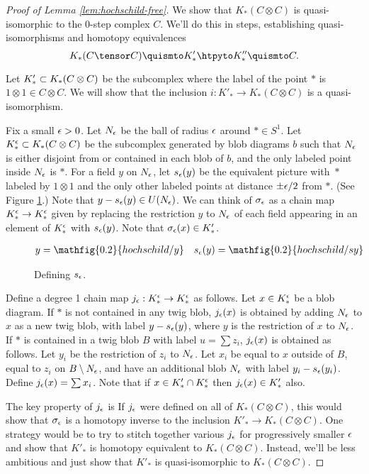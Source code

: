 \begin{proof}[Proof of Lemma \ref{lem:hochschild-free}]
We show that $K_*(C\otimes C)$ is
quasi-isomorphic to the 0-step complex $C$. We'll do this in steps, establishing quasi-isomorphisms and homotopy equivalences
$$K_*(C \tensor C) \quismto K'_* \htpyto K''_* \quismto C.$$

Let $K'_* \subset K_*(C\otimes C)$ be the subcomplex where the label of
the point $*$ is $1 \otimes 1 \in C\otimes C$.
We will show that the inclusion $i: K'_* \to K_*(C\otimes C)$ is a quasi-isomorphism.

Fix a small $\epsilon > 0$.
Let $N_\epsilon$ be the ball of radius $\epsilon$ around $* \in S^1$.
Let $K_*^\epsilon \subset K_*(C\otimes C)$ be the subcomplex
generated by blob diagrams $b$ such that $N_\epsilon$ is either disjoint from
or contained in each blob of $b$, and the only labeled point inside $N_\epsilon$ is $*$.
For a field $y$ on $N_\epsilon$, let $s_\epsilon(y)$ be the equivalent picture with~$*$
labeled by $1\otimes 1$ and the only other labeled points at distance $\pm\epsilon/2$ from $*$.
(See Figure \ref{fig:sy}.) Note that $y - s_\epsilon(y) \in U(N_\epsilon)$. We can think of
$\sigma_\epsilon$ as a chain map $K_*^\epsilon \to K_*^\epsilon$ given by replacing the restriction $y$ to $N_\epsilon$ of each field
appearing in an element of  $K_*^\epsilon$ with $s_\epsilon(y)$.
Note that $\sigma_\epsilon(x) \in K'_*$.
\begin{figure}[!ht]
\begin{align*}
y & = \mathfig{0.2}{hochschild/y} &
s_\ep(y) & = \mathfig{0.2}{hochschild/sy}
\end{align*}
\caption{Defining $s_\epsilon$.}
\label{fig:sy}
\end{figure}

Define a degree 1 chain map $j_\epsilon : K_*^\epsilon \to K_*^\epsilon$ as follows.
Let $x \in K_*^\epsilon$ be a blob diagram.
If $*$ is not contained in any twig blob, $j_\epsilon(x)$ is obtained by adding $N_\epsilon$ to
$x$ as a new twig blob, with label $y - s_\epsilon(y)$, where $y$ is the restriction of $x$ to $N_\epsilon$.
If $*$ is contained in a twig blob $B$ with label $u = \sum z_i$, $j_\epsilon(x)$ is obtained as follows.
Let $y_i$ be the restriction of $z_i$ to $N_\epsilon$.
Let $x_i$ be equal to $x$ outside of $B$, equal to $z_i$ on $B \setminus N_\epsilon$,
and have an additional blob $N_\epsilon$ with label $y_i - s_\epsilon(y_i)$.
Define $j_\epsilon(x) = \sum x_i$.
Note that if $x \in K'_* \cap K_*^\epsilon$ then $j_\epsilon(x) \in K'_*$ also.

The key property of $j_\epsilon$ is
If $j_\epsilon$ were defined on all of $K_*(C\otimes C)$, this would show that $\sigma_\epsilon$
is a homotopy inverse to the inclusion $K'_* \to K_*(C\otimes C)$.
One strategy would be to try to stitch together various $j_\epsilon$ for progressively smaller
$\epsilon$ and show that $K'_*$ is homotopy equivalent to $K_*(C\otimes C)$.
Instead, we'll be less ambitious and just show that
$K'_*$ is quasi-isomorphic to $K_*(C\otimes C)$.


\end{proof}
